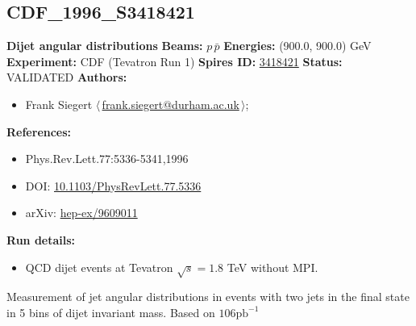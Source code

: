 \subsection[CDF\_1996\_S3418421]{CDF\_1996\_S3418421\,\cite{Abe:1996mj}}
\textbf{Dijet angular distributions}\newline
\textbf{Beams:} $p$\,$\bar{p}$ \newline
\textbf{Energies:} (900.0, 900.0) GeV \newline
\textbf{Experiment:} CDF (Tevatron Run 1) \newline
\textbf{Spires ID:} \href{http://www.slac.stanford.edu/spires/find/hep/www?rawcmd=key+3418421}{3418421}\newline
\textbf{Status:} VALIDATED\newline
\textbf{Authors:}
\begin{itemize}
  \item Frank Siegert $\langle\,$\href{mailto:frank.siegert@durham.ac.uk}{frank.siegert@durham.ac.uk}$\,\rangle$;
\end{itemize}
\textbf{References:}
\begin{itemize}
  \item Phys.Rev.Lett.77:5336-5341,1996
  \item DOI: \href{http://dx.doi.org/10.1103/PhysRevLett.77.5336}{10.1103/PhysRevLett.77.5336}
  \item arXiv: \href{http://arxiv.org/abs/hep-ex/9609011}{hep-ex/9609011}
\end{itemize}
\textbf{Run details:}
\begin{itemize}

  \item QCD dijet events at Tevatron $\sqrt{s}=1.8$ TeV without MPI.\end{itemize}

\noindent Measurement of jet angular distributions in events with two jets in the final state in 5 bins of dijet invariant mass. Based on $106 \mathrm{pb}^{-1}$

\clearpage


\clearpage

